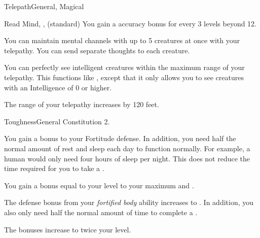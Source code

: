 \begin{magicalfeat}{Telepath}{General, Magical}
\begin{magicalsustainability}{Read Mind}{, ,  (standard)}
      \rankline
      You gain a  accuracy bonus for every 3 levels beyond 12.
    \end{magicalsustainability}

     You can maintain mental channels with up to 5 creatures at once with your telepathy.
    You can send separate thoughts to each creature.

     You can perfectly see intelligent creatures within the maximum range of your telepathy.
    This functions like , except that it only allows you to see creatures with an Intelligence of 0 or higher.

     The range of your telepathy increases by 120 feet.
  \end{magicalfeat}

  \begin{feat}{Toughness}{General}
    \featpre Constitution 2.

     You gain a  bonus to your Fortitude defense.
    In addition, you need half the normal amount of rest and sleep each day to function normally.
    For example, a human would only need four hours of sleep per night.
    This does not reduce the time required for you to take a .

     You gain a bonus equal to your level to your maximum  and .

     The defense bonus from your \textit{fortified body} ability increases to .
    In addition, you also only need half the normal amount of time to complete a .

     The bonuses increase to twice your level.
  \end{feat}

